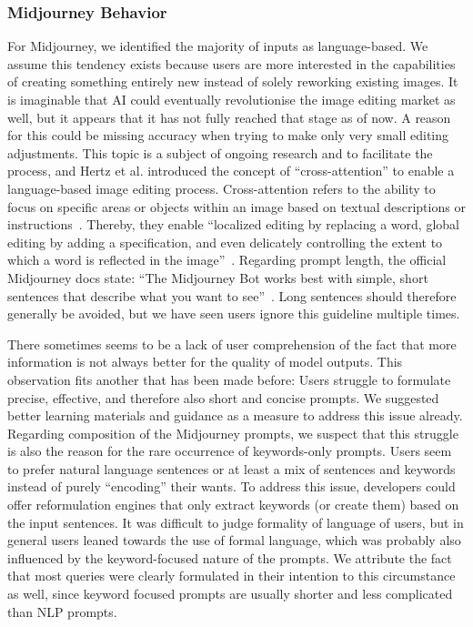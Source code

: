 \subsubsection{Midjourney Behavior}
For Midjourney, we identified the majority of inputs as language-based.
We assume this tendency exists because users are more interested in the capabilities of creating
something entirely new instead of solely reworking existing images.
It is imaginable that AI could eventually revolutionise the image editing market as well, but
it appears that it has not fully reached that stage as of now.
A reason for this could be missing accuracy when trying to make only very small editing adjustments.
This topic is a subject of ongoing research and to facilitate the process, and Hertz et al\(.\) introduced
the concept of ``cross-attention'' to enable a language-based image editing process.
Cross-attention refers to the ability to focus on specific areas or objects within an image
based on textual descriptions or instructions~\cite{hertz_prompt--prompt_2022}.
Thereby, they enable ``localized editing by replacing a word, global editing by adding a
specification, and even delicately controlling the extent to which a word is reflected in the
image''~\cite{hertz_prompt--prompt_2022}.
Regarding prompt length, the official Midjourney docs state: ``The Midjourney Bot works best with
simple, short sentences that describe what you want to see''~\cite{midjourney_documentation_2023}.
Long sentences should therefore generally be avoided, but we have seen users ignore this guideline
multiple times.

There sometimes seems to be a lack of user comprehension of the fact that more information is not
always better for the quality of model outputs.
This observation fits another that has been made before:
Users struggle to formulate precise, effective, and therefore also short and concise prompts.
We suggested better learning materials and guidance as a measure to address this issue already.
Regarding composition of the Midjourney prompts, we suspect that this struggle is also the reason
for the rare occurrence of keywords-only prompts.
Users seem to prefer natural language sentences or at least a mix of sentences and keywords
instead of purely ``encoding'' their wants.
To address this issue, developers could offer reformulation engines that only extract keywords (or
create them) based on the input sentences.
It was difficult to judge formality of language of users, but in general users leaned towards the
use of formal language, which was probably also influenced by the keyword-focused nature of the prompts.
We attribute the fact that most queries were clearly formulated in their intention to this
circumstance as well,
since keyword focused prompts are usually shorter and less complicated than NLP prompts.

